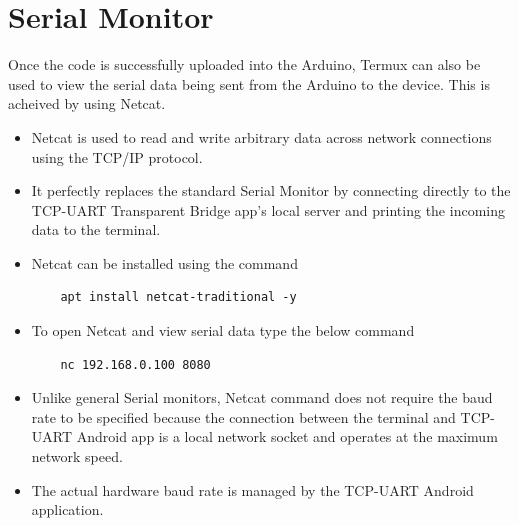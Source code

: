 \documentclass[conference]{IEEEtran} %
\begin{document}


\section{Serial Monitor}

Once the code is successfully uploaded into the Arduino, Termux can also be used to view the serial data being sent from the Arduino to the device. This is acheived by using Netcat. 

\begin{itemize}
    \item Netcat is used to read and write arbitrary data across network connections using the TCP/IP protocol. 
    \item It perfectly replaces the standard Serial Monitor by connecting directly to the TCP-UART Transparent Bridge app's local server and printing the incoming data to the terminal.
    \item Netcat can be installed using the command
\begin{lstlisting}
    apt install netcat-traditional -y
\end{lstlisting}
    \item To open Netcat and view serial data type the below command
\begin{lstlisting}
    nc 192.168.0.100 8080
\end{lstlisting}
    \item Unlike general Serial monitors, Netcat command does not require the baud rate to be specified because the connection between the terminal and TCP-UART Android app is a local network socket and operates at the maximum network speed. 
    \item The actual hardware baud rate is managed by the TCP-UART Android application.
\end{itemize}
\end{document}
